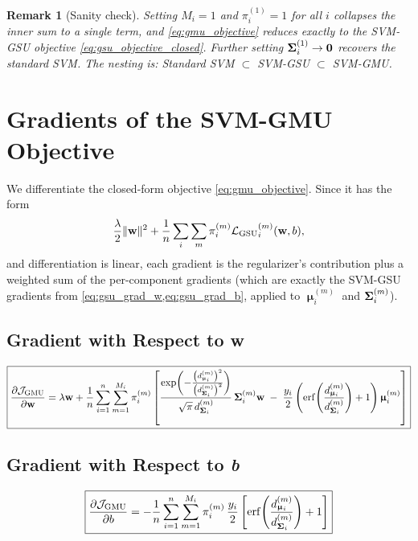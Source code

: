 \documentclass[11pt, letterpaper]{article}
\newcommand{\bSigma}{\vb{\Sigma}}
\newcommand{\bmu}{\boldsymbol{\upmu}}
\newcommand{\loss}{\mathcal{L}}
\newcommand{\obj}{\mathcal{J}}
\newtheorem{remark}{Remark}[section]
\begin{document}
\begin{remark}[Sanity check]
Setting $M_i = 1$ and $\pi_i^{(1)} = 1$ for all $i$ collapses the inner sum to a single term, and \cref{eq:gmu_objective} reduces exactly to the SVM-GSU objective \cref{eq:gsu_objective_closed}. Further setting $\bSigma_i^{(1)} \to \vb{0}$ recovers the standard SVM. The nesting is: Standard SVM $\subset$ SVM-GSU $\subset$ SVM-GMU.
\end{remark}

\section{Gradients of the SVM-GMU Objective}\label{sec:gmu_gradients}

We differentiate the closed-form objective \cref{eq:gmu_objective}. Since it has the form
\begin{equation*}
    \frac{\lambda}{2}\|\vb{w}\|^2 + \frac{1}{n}\sum_i \sum_m \pi_i^{(m)} {\loss_{\text{GSU}}}_{i}^{(m)}(\vb{w}, b),
\end{equation*}
and differentiation is linear, each gradient is the regularizer's contribution plus a weighted sum of the per-component gradients (which are exactly the SVM-GSU gradients from \cref{eq:gsu_grad_w,eq:gsu_grad_b}, applied to $\bmu_i^{(m)}$ and $\bSigma_i^{(m)}$).

\subsection{Gradient with Respect to w}

\begin{equation}\label{eq:gmu_grad_w}
    \boxed{\pdv{\obj_{\text{GMU}}}{\vb{w}} = \lambda \vb{w}
    + \frac{1}{n}\sum_{i=1}^{n}\sum_{m=1}^{M_i} \pi_i^{(m)} \left[\frac{\exp\!\left(-\frac{\left(d_{\bmu_i}^{(m)}\right)^2}{\left(d_{\bSigma_i}^{(m)}\right)^2}\right)}{\sqrt{\pi}\, d_{\bSigma_i}^{(m)}}\, \bSigma_i^{(m)} \vb{w} \;-\; \frac{y_i}{2}\left(\mathrm{erf}\!\left(\frac{d_{\bmu_i}^{(m)}}{d_{\bSigma_i}^{(m)}}\right) + 1\right) \bmu_i^{(m)}\right]}
\end{equation}

\subsection{Gradient with Respect to \textit{b}}

\begin{equation}\label{eq:gmu_grad_b}
    \boxed{\pdv{\obj_{\text{GMU}}}{b} = -\frac{1}{n}\sum_{i=1}^{n}\sum_{m=1}^{M_i} \pi_i^{(m)}\, \frac{y_i}{2}\left[\mathrm{erf}\!\left(\frac{d_{\bmu_i}^{(m)}}{d_{\bSigma_i}^{(m)}}\right) + 1\right]}
\end{equation}
\end{document}
